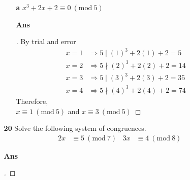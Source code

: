 \documentclass[paper=usletter, fontsize=12pt]{article}
\newcommand{\Mod}[1]{\ (\mathrm{mod}\ #1)}
\begin{document}
\begin{itemize}
\begin{itemize}
\begin{itemize}
                \item[\textbf{a}] $x^3+2x+2 \equiv 0 \Mod{5}$
                \item[\textbf{Ans}]
                \begin{proof}[\unskip\nopunct]
                    By trial and error
                    \begin{align*}
                        x=1 &\Rightarrow 5 \mid (1)^3+2(1)+2=5\\
                        x=2 &\Rightarrow 5 \nmid (2)^3+2(2)+2=14\\
                        x=3 &\Rightarrow 5 \mid (3)^3+2(3)+2=35\\
                        x=4 &\Rightarrow 5 \nmid (4)^3+2(4)+2=74
                    \end{align*}
                    Therefore,\\
                    $x \equiv 1 \Mod{5}$ and $x \equiv 3 \Mod{5}$ \qedhere
                \end{proof}
                \vspace{0.2in}

            \end{itemize}

            \item[\textbf{20}] Solve the following system of congruences.
            \begin{align*}
                2x & \equiv 5 \Mod{7} & 3x & \equiv 4 \Mod{8}
            \end{align*}
            \item[\textbf{Ans}]
            \begin{proof}[\unskip\nopunct]


\end{proof}
\end{itemize}
\end{itemize}
\end{document}
